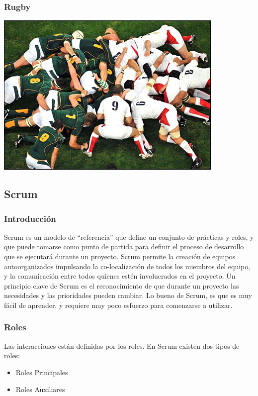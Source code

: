 \documentclass[12pt]{beamer}
\begin{document}
\begin{frame}
\frametitle{Rugby}
  \includegraphics[scale=0.5]{img/scrum_rugby.png}
\end{frame}
\subsection{Scrum}

\begin{frame}
 \frametitle{Introducción}
 Scrum es un modelo de ``referencia'' que define un conjunto de \alert{prácticas} y \alert{roles}, y que puede tomarse como punto de partida para definir el proceso de desarrollo que se ejecutará durante un proyecto. 
 \newline
 Scrum permite la creación de equipos autoorganizados impulsando la co-localización de todos los miembros del equipo, y la \alert{comunicación} entre todos quienes estén \alert{involucrados} en el proyecto.
 \newline
 Un principio clave de Scrum es el reconocimiento de que durante un proyecto las necesidades y las prioridades pueden \alert{cambiar}. Lo bueno de Scrum, es que es muy fácil de aprender, y requiere muy poco esfuerzo para comenzarse a utilizar.
\end{frame}

\begin{frame}
 \frametitle{Roles}
 Las interacciones están definidas por los roles. En Scrum existen dos tipos de roles:
 \begin{itemize}
  \item<2-> Roles Principales
  \item<3-> Roles Auxiliares
 \end{itemize}
\end{frame}
\end{document}

